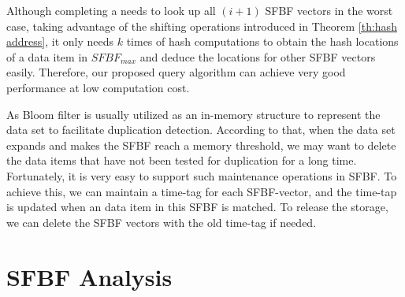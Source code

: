 \documentclass[10pt,journal,letterpaper]{IEEEtran}
\newcommand{\rev}[1]{\uwave{#1}}
\newcommand{\note}[1]{{\sffamily\itshape\bfseries\uline{#1}}}
\begin{document}

Although completing a \rev{membership query} needs to look up all $(i+1)$ SFBF vectors in the worst case, taking advantage of the shifting operations introduced in Theorem \ref{th:hash address}, it only needs $k$ times of hash computations to obtain the hash locations of a data item in $SFBF_{max}$ and deduce the locations for other SFBF vectors easily. Therefore, our proposed query algorithm can achieve very good performance at low computation cost.


As Bloom filter is usually utilized as an in-memory structure to represent the  data set to facilitate duplication detection. According to that,  when the data set expands and makes the SFBF reach a memory threshold, we may want to delete the data items that have not been tested for duplication for a long time. Fortunately, it is very easy to support such maintenance operations in SFBF. To achieve this, we can maintain a time-tag for each SFBF-vector, and the time-tap is updated when an data item in this SFBF is matched. To release the storage, we can delete the SFBF vectors with the old time-tag if needed.

%
\section{SFBF Analysis}
\label{sec:SFBF Analysis}
\end{document}
